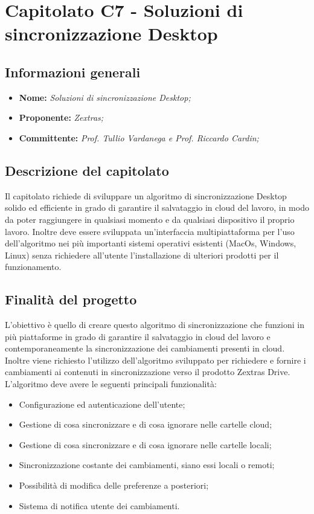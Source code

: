 \section{Capitolato C7 - Soluzioni di sincronizzazione Desktop}
\subsection{Informazioni generali}
	\begin{itemize}
	\item \textbf{Nome:} \textit{Soluzioni di sincronizzazione Desktop;}
	\item \textbf{Proponente:} \textit{Zextras;}
	\item \textbf{Committente:}  \textit{Prof. Tullio Vardanega e Prof. Riccardo Cardin;}
	\end{itemize}
\subsection{Descrizione del capitolato}
Il capitolato richiede di sviluppare un algoritmo di sincronizzazione Desktop solido ed efficiente in grado di garantire il salvataggio in cloud del lavoro, in modo da poter raggiungere in qualsiasi momento e da qualsiasi dispositivo il proprio lavoro. Inoltre deve essere sviluppata un'interfaccia multipiattaforma per l'uso dell'algoritmo nei più importanti sistemi operativi esistenti (MacOs, Windows, Linux) senza richiedere all'utente l'installazione di ulteriori prodotti per il funzionamento.
\subsection{Finalità del progetto}
L'obiettivo è quello di creare questo algoritmo di sincronizzazione che funzioni in più piattaforme in grado di garantire il salvataggio in cloud del lavoro e contemporaneamente la sincronizzazione dei cambiamenti presenti in cloud. Inoltre viene richiesto l'utilizzo dell’algoritmo sviluppato per richiedere e fornire i cambiamenti ai contenuti in sincronizzazione verso il prodotto Zextras Drive.
L'algoritmo deve avere le seguenti principali funzionalità:
\begin{itemize}
\item Configurazione ed autenticazione dell’utente;
\item Gestione di cosa sincronizzare e di cosa ignorare nelle cartelle cloud;
\item Gestione di cosa sincronizzare e di cosa ignorare nelle cartelle locali;
\item Sincronizzazione costante dei cambiamenti, siano essi locali o remoti;
\item Possibilità di modifica delle preferenze a posteriori;
\item Sistema di notifica utente dei cambiamenti.
\end{itemize}
